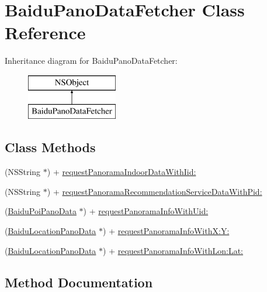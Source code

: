 \hypertarget{interface_baidu_pano_data_fetcher}{}\section{Baidu\+Pano\+Data\+Fetcher Class Reference}
\label{interface_baidu_pano_data_fetcher}
Inheritance diagram for Baidu\+Pano\+Data\+Fetcher\+:\begin{figure}[H]
\begin{center}
\leavevmode
\includegraphics[height=2.000000cm]{interface_baidu_pano_data_fetcher}
\end{center}
\end{figure}
\subsection*{Class Methods}
\begin{DoxyCompactItemize}
\item 
(N\+S\+String $\ast$) + \hyperlink{interface_baidu_pano_data_fetcher_a984af94df4bdd13ecc4bf1bf2d7c9af9}{request\+Panorama\+Indoor\+Data\+With\+Iid\+:}
\item 
(N\+S\+String $\ast$) + \hyperlink{interface_baidu_pano_data_fetcher_a4df72f7368ecbeed658fbc0848ee0036}{request\+Panorama\+Recommendation\+Service\+Data\+With\+Pid\+:}
\item 
(\hyperlink{interface_baidu_poi_pano_data}{Baidu\+Poi\+Pano\+Data} $\ast$) + \hyperlink{interface_baidu_pano_data_fetcher_a24973faff16b705c6f5be43233af3550}{request\+Panorama\+Info\+With\+Uid\+:}
\item 
(\hyperlink{interface_baidu_location_pano_data}{Baidu\+Location\+Pano\+Data} $\ast$) + \hyperlink{interface_baidu_pano_data_fetcher_a399cac6672a5acc2571c751c8f6886a9}{request\+Panorama\+Info\+With\+X\+:\+Y\+:}
\item 
(\hyperlink{interface_baidu_location_pano_data}{Baidu\+Location\+Pano\+Data} $\ast$) + \hyperlink{interface_baidu_pano_data_fetcher_a13ba4cab3f69d9cd79aaad3ff0b81ec7}{request\+Panorama\+Info\+With\+Lon\+:\+Lat\+:}
\end{DoxyCompactItemize}


\subsection{Method Documentation}
\hypertarget{interface_baidu_pano_data_fetcher_a984af94df4bdd13ecc4bf1bf2d7c9af9}{}
